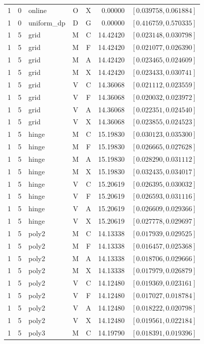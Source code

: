 \begin{longtable}{r r l c c r l}
1 & 0 & online & O & X & 0.00000 & $[0.039758,0.061884]$ \\
1 & 0 & uniform\_dp & D & G & 0.00000 & $[0.416759,0.570335]$ \\
1 & 5 & grid & M & C & 14.42420 & $[0.023148,0.030798]$ \\
1 & 5 & grid & M & F & 14.42420 & $[0.021077,0.026390]$ \\
1 & 5 & grid & M & A & 14.42420 & $[0.023465,0.024609]$ \\
1 & 5 & grid & M & X & 14.42420 & $[0.023433,0.030741]$ \\
1 & 5 & grid & V & C & 14.36068 & $[0.021112,0.023559]$ \\
1 & 5 & grid & V & F & 14.36068 & $[0.020032,0.023972]$ \\
1 & 5 & grid & V & A & 14.36068 & $[0.022351,0.024540]$ \\
1 & 5 & grid & V & X & 14.36068 & $[0.023855,0.024523]$ \\
1 & 5 & hinge & M & C & 15.19830 & $[0.030123,0.035300]$ \\
1 & 5 & hinge & M & F & 15.19830 & $[0.026665,0.027628]$ \\
1 & 5 & hinge & M & A & 15.19830 & $[0.028290,0.031112]$ \\
1 & 5 & hinge & M & X & 15.19830 & $[0.032435,0.034017]$ \\
1 & 5 & hinge & V & C & 15.20619 & $[0.026395,0.030032]$ \\
1 & 5 & hinge & V & F & 15.20619 & $[0.026593,0.031116]$ \\
1 & 5 & hinge & V & A & 15.20619 & $[0.026609,0.029366]$ \\
1 & 5 & hinge & V & X & 15.20619 & $[0.027778,0.029697]$ \\
1 & 5 & poly2 & M & C & 14.13338 & $[0.017939,0.029525]$ \\
1 & 5 & poly2 & M & F & 14.13338 & $[0.016457,0.025368]$ \\
1 & 5 & poly2 & M & A & 14.13338 & $[0.018706,0.029666]$ \\
1 & 5 & poly2 & M & X & 14.13338 & $[0.017979,0.026879]$ \\
1 & 5 & poly2 & V & C & 14.12480 & $[0.019369,0.023161]$ \\
1 & 5 & poly2 & V & F & 14.12480 & $[0.017027,0.018784]$ \\
1 & 5 & poly2 & V & A & 14.12480 & $[0.018222,0.020798]$ \\
1 & 5 & poly2 & V & X & 14.12480 & $[0.019561,0.022184]$ \\
1 & 5 & poly3 & M & C & 14.19790 & $[0.018391,0.019396]$ \\

\end{longtable}
